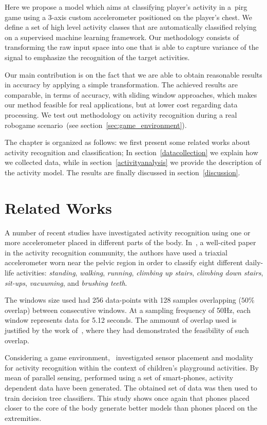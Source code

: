Here we propose a model which aims at classifying player's activity in a~\gls{pirg} game using a 3-axis custom accelerometer positioned on the player's chest. We define a set of high level activity classes that are automatically classified relying on a supervised machine learning framework. Our methodology consists of transforming the raw input space into one that is able to capture variance of the signal to emphasize the recognition of the target activities. 

Our main contribution is on the fact that we are able to obtain reasonable results in accuracy by applying a simple transformation. The achieved results are comparable, in terms of accuracy, with sliding window approaches, which makes our method feasible for real applications, but at lower cost regarding data processing. We test out methodology on activity recognition during a real robogame scenario~(see section~\ref{sec:game_environment}). 

The chapter is organized as follows: we first present some related works about activity recognition and classification; In section~\ref{datacollection} we explain how we collected data, while in section~\ref{activityanalysis} we provide the description of the activity model. The results are finally discussed in section~\ref{discussion}.

\section{Related Works}\label{relatedworks}

A number of recent studies have investigated activity recognition using one or more accelerometer placed in different parts of the body. In~\cite{ravi_activity_2005}, a well-cited paper in the activity recognition community, the authors have used a triaxial accelerometer worn near the pelvic region in order to classify eight different daily-life activities: \textit{standing}, \textit{walking}, \textit{running}, \textit{climbing up stairs}, \textit{climbing down stairs}, \textit{sit-ups}, \textit{vacuuming}, and \textit{brushing teeth}.

The windows size used had 256 data-points with 128 samples overlapping ($50\%$ overlap) between consecutive windows. At a sampling frequency of 50Hz, each window represents data for 5.12 seconds. The ammount of overlap used is justified by the work of~\cite{bao_activity_2004}, where they had demonstrated the feasibility of such overlap. 

Considering a game environment,~\cite{jablonsky_evaluating_2017} investigated sensor placement and modality for activity recognition within the context of children's playground  activities. By mean of parallel sensing, performed using a set of smart-phones, activity dependent data have been generated. The obtained set of data was then used to train decision tree classifiers. This study shows once again that phones placed closer to the core of the body generate better models than phones placed on the  extremities. 


